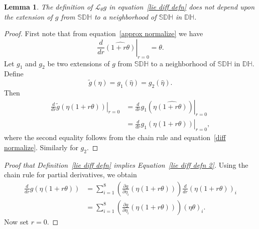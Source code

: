 \documentclass[reqno,12pt]{amsart}
\newcommand\setinvertibledualquat{\mathbb D\mathbb H}
\newcommand\setunitdualquat{\mathbb S\mathbb D\mathbb H}
\newcommand{\liederiv}{\mathcal L}
\newtheorem{Lemma}{Lemma}
\begin{document}
\begin{Lemma}
\label{not depend}
The definition of $\liederiv_\theta g$ in equation~\eqref{lie diff defn} does not depend upon the extension of $g$ from $\setunitdualquat$ to a neighborhood of $\setunitdualquat$ in $\setinvertibledualquat$.
\end{Lemma}

\begin{proof}  First note that from equation~\eqref{approx normalize} we have
\begin{equation}
\label{diff normalize}
\left.\frac d{dr} \widehat{(1 + r \theta)} \right|_{r=0} = \theta.
\end{equation}
Let $g_1$ and $g_2$ be two extensions of $g$ from $\setunitdualquat$ to a neighborhood of $\setunitdualquat$ in $\setinvertibledualquat$.  Define
\begin{equation}
\tilde g(\eta) = g_1(\widehat\eta) = g_2(\widehat\eta).
\end{equation}
Then
\begin{equation}
\begin{aligned}
\left.\frac{d}{d r} \tilde g(\eta(1+r\theta)) \right |_{r = 0}
&=
\left.\frac{d}{d r} g_1(\eta\widehat{(1+r\theta)}) \right |_{r = 0} \\
&=\left.\frac{d}{d r} g_1(\eta(1+r\theta)) \right |_{r = 0},
\end{aligned}
\end{equation}
where the second equality follows from the chain rule and equation~\eqref{diff normalize}.  Similarly for $g_2$.
\end{proof}

\begin{proof}[Proof that Definition~\eqref{lie diff defn} implies Equation~\eqref{lie diff defn 2}]

Using the chain rule for partial derivatives, we obtain
\begin{equation}
\begin{aligned}
\frac{d}{d r} g(\eta(1+r\theta))
&= \sum_{i=1}^8 \left(\frac{\partial g}{\partial \eta_i}(\eta(1+r\theta))\right) \frac{d}{d r} (\eta(1+r\theta))_i 
\\
&= \sum_{i=1}^8 \left(\frac{\partial g}{\partial \eta_i}(\eta(1+r\theta))\right) (\eta\theta)_i .
\end{aligned}
\end{equation}
Now set $r = 0$.
\end{proof}
\end{document}
